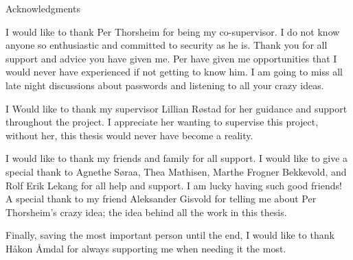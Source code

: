 {\centering 
{\Huge Acknowledgments} \\

\vspace{1cm}

I would like to thank Per Thorsheim for being my co-supervisor. I do not know anyone so enthusiastic and committed to security as he is. Thank you for all support and advice you have given me. Per have given me opportunities that I would never have experienced if not getting to know him. I am going to miss all late night discussions about passwords and listening to all your crazy ideas. 

I Would like to thank my supervisor Lillian Røstad for her guidance and support throughout the project. I appreciate her wanting to supervise this project, without her, this thesis would never have become a reality.

I would like to thank my friends and family for all support. I would like to give a special thank to Agnethe Søraa, Thea Mathisen, Marthe Frogner Bekkevold, and Rolf Erik Lekang for all help and support. I am lucky having such good friends! A special thank to my friend Aleksander Gisvold for telling me about Per Thorsheim's crazy idea; the idea behind all the work in this thesis.

Finally, saving the most important person until the end, I would like to thank Håkon Åmdal for always supporting me when needing it the most.

}